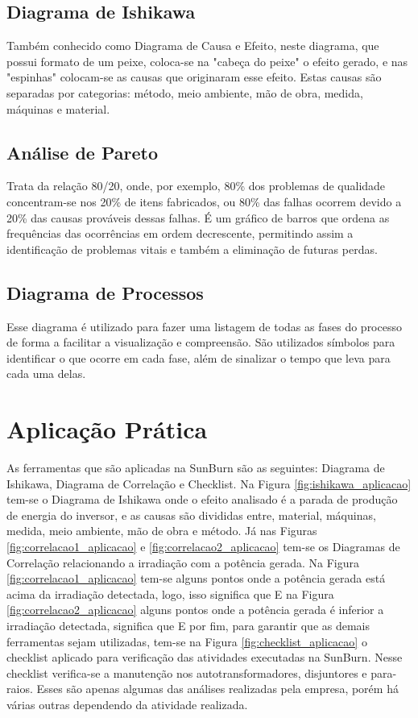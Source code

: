 \subsection{Diagrama de Ishikawa}
Também conhecido como Diagrama de Causa e Efeito, neste diagrama, que possui formato de um peixe, coloca-se na "cabeça do peixe" o efeito gerado, e nas "espinhas" colocam-se as causas que originaram esse efeito. Estas causas são separadas por categorias: método, meio ambiente, mão de obra, medida, máquinas e material.

\subsection{Análise de Pareto}
Trata da relação 80/20, onde, por exemplo, 80\% dos problemas de qualidade concentram-se nos 20\% de itens fabricados, ou 80\% das falhas ocorrem devido a 20\% das causas prováveis dessas falhas. É um gráfico de barros que ordena as frequências das ocorrências em ordem decrescente, permitindo assim a identificação de problemas vitais e também a eliminação de futuras perdas. 

\subsection{Diagrama de Processos}
Esse diagrama é utilizado para fazer uma listagem de todas as fases do processo de forma a facilitar a visualização e compreensão. São utilizados símbolos para identificar o que ocorre em cada fase, além de sinalizar o tempo que leva para cada uma delas.


\section{Aplicação Prática}
\label{sec:controle_estatistico_aplicacao}
As ferramentas que são aplicadas na SunBurn são as seguintes: Diagrama de Ishikawa, Diagrama de Correlação e Checklist.
Na Figura \ref{fig:ishikawa_aplicacao} tem-se o Diagrama de Ishikawa onde o efeito analisado é a parada de produção de energia do inversor, e as causas são divididas entre, material, máquinas, medida, meio ambiente, mão de obra e método.
Já nas Figuras \ref{fig:correlacao1_aplicacao} e \ref{fig:correlacao2_aplicacao} tem-se os Diagramas de Correlação relacionando a irradiação com a potência gerada. Na Figura \ref{fig:correlacao1_aplicacao} tem-se alguns pontos onde a potência gerada está acima da irradiação detectada, logo, isso significa que 
E na Figura \ref{fig:correlacao2_aplicacao} alguns pontos onde a potência gerada é inferior a irradiação detectada, significa que  
E por fim, para garantir que as demais ferramentas sejam utilizadas, tem-se na Figura \ref{fig:checklist_aplicacao} o checklist aplicado para verificação das atividades executadas na SunBurn. Nesse checklist verifica-se a manutenção nos autotransformadores, disjuntores e para-raios. Esses são apenas algumas das análises realizadas pela empresa, porém há várias outras dependendo da atividade realizada.

